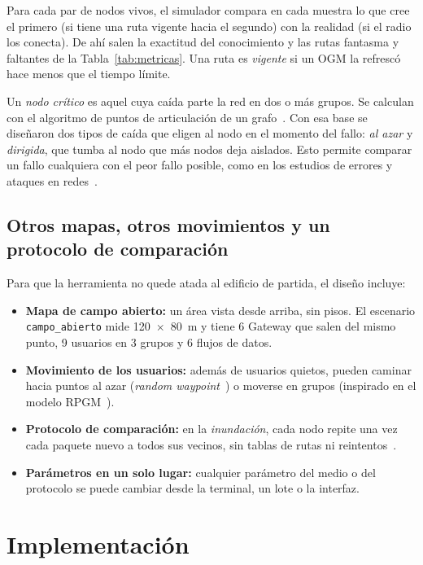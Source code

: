 Para cada par de nodos vivos, el simulador compara en cada muestra lo que cree
el primero (si tiene una ruta vigente hacia el segundo) con la realidad (si el
radio los conecta). De ahí salen la exactitud del conocimiento y las rutas
fantasma y faltantes de la Tabla~\ref{tab:metricas}. Una ruta es
\textit{vigente} si un OGM la refrescó hace menos que el tiempo límite.

Un \textit{nodo crítico} es aquel cuya caída parte la red en dos o más grupos.
Se calculan con el algoritmo de puntos de articulación de un
grafo~\cite{Hopcroft1973Algorithm447}. Con esa base se diseñaron dos tipos de
caída que eligen al nodo en el momento del fallo: \textit{al azar} y
\textit{dirigida}, que tumba al nodo que más nodos deja aislados. Esto permite
comparar un fallo cualquiera con el peor fallo posible, como en los estudios de
errores y ataques en redes~\cite{Albert2000ErrorAttack}.

\subsection{Otros mapas, otros movimientos y un protocolo de comparación}
\label{sec:generalidad}

Para que la herramienta no quede atada al edificio de partida, el diseño
incluye:

\begin{itemize}
\item \textbf{Mapa de campo abierto:} un área vista desde arriba, sin pisos. El
escenario \texttt{campo\_abierto} mide 120~$\times$~80~m y tiene 6 Gateway que
salen del mismo punto, 9 usuarios en 3 grupos y 6 flujos de datos.
\item \textbf{Movimiento de los usuarios:} además de usuarios quietos, pueden
caminar hacia puntos al azar (\textit{random
waypoint}~\cite{Camp2002MobilitySurvey}) o moverse en grupos (inspirado en el
modelo RPGM~\cite{Hong1999GroupMobility}).
\item \textbf{Protocolo de comparación:} en la \textit{inundación}, cada nodo
repite una vez cada paquete nuevo a todos sus vecinos, sin tablas de rutas ni
reintentos~\cite{Ni1999BroadcastStorm}.
\item \textbf{Parámetros en un solo lugar:} cualquier parámetro del medio o del
protocolo se puede cambiar desde la terminal, un lote o la interfaz.
\end{itemize}

\section{Implementación}
\label{sec:implementacion}

